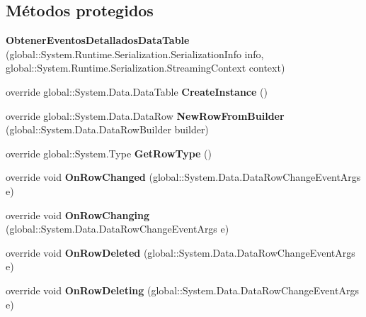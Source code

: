 \subsection*{Métodos protegidos}
\begin{DoxyCompactItemize}
\item 
{\bfseries Obtener\+Eventos\+Detallados\+Data\+Table} (global\+::\+System.\+Runtime.\+Serialization.\+Serialization\+Info info, global\+::\+System.\+Runtime.\+Serialization.\+Streaming\+Context context)\label{class_resa___pro_1_1_resa_d_b_data_set_1_1_obtener_eventos_detallados_data_table_a320b6ea974d03811f552e3c0265d36db}

\item 
override global\+::\+System.\+Data.\+Data\+Table {\bfseries Create\+Instance} ()\label{class_resa___pro_1_1_resa_d_b_data_set_1_1_obtener_eventos_detallados_data_table_a5c93b95c06c150a244fe0bd9e1ceda50}

\item 
override global\+::\+System.\+Data.\+Data\+Row {\bfseries New\+Row\+From\+Builder} (global\+::\+System.\+Data.\+Data\+Row\+Builder builder)\label{class_resa___pro_1_1_resa_d_b_data_set_1_1_obtener_eventos_detallados_data_table_a6ae84d0f806cc47a3a0301531ed5fe40}

\item 
override global\+::\+System.\+Type {\bfseries Get\+Row\+Type} ()\label{class_resa___pro_1_1_resa_d_b_data_set_1_1_obtener_eventos_detallados_data_table_ad0be6a841ce5a65c812e257559f02de5}

\item 
override void {\bfseries On\+Row\+Changed} (global\+::\+System.\+Data.\+Data\+Row\+Change\+Event\+Args e)\label{class_resa___pro_1_1_resa_d_b_data_set_1_1_obtener_eventos_detallados_data_table_a7eb0ac3d59cb0bf36824ff8c6212693e}

\item 
override void {\bfseries On\+Row\+Changing} (global\+::\+System.\+Data.\+Data\+Row\+Change\+Event\+Args e)\label{class_resa___pro_1_1_resa_d_b_data_set_1_1_obtener_eventos_detallados_data_table_a2e4ef5f806964ec503ffa37d6686837d}

\item 
override void {\bfseries On\+Row\+Deleted} (global\+::\+System.\+Data.\+Data\+Row\+Change\+Event\+Args e)\label{class_resa___pro_1_1_resa_d_b_data_set_1_1_obtener_eventos_detallados_data_table_a5b9414c74ff564eb62ae8ac7f2613748}

\item 
override void {\bfseries On\+Row\+Deleting} (global\+::\+System.\+Data.\+Data\+Row\+Change\+Event\+Args e)\label{class_resa___pro_1_1_resa_d_b_data_set_1_1_obtener_eventos_detallados_data_table_aa2c7757a15f0f56a701aeb4497b9b97f}


\end{DoxyCompactItemize}
